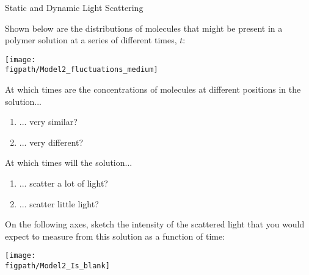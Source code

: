 \begin{activity}{Static and Dynamic Light Scattering}
\begin{model}
	Shown below are the distributions of molecules that might be present in a polymer solution at a series of different times, $t$:
	
	\vspace{6pt}
	\centerline{\texttt{[image: \\figpath/Model2\_fluctuations\_medium]}}
	
\end{model}

\begin{ctqs}

	\question At which times are the concentrations of molecules at different positions in the solution...
	
		\begin{enumerate}
			\item ... very similar?
			
				\begin{solution}[0.25in]
				\end{solution}
			
			\item ... very different?
			
				\begin{solution}[0.25in]
				\end{solution}
		\end{enumerate}
		
	\question At which times will the solution...
	
		\begin{enumerate}
			\item ... scatter a lot of light?
			
				\begin{solution}[0.25in]
				\end{solution}
			
			\item ... scatter little light?
			
				\begin{solution}[0.25in]
				\end{solution}
				
		\end{enumerate}
		
		\clearpage
	\question On the following axes, sketch the intensity of the scattered light that you would expect to measure from this solution as a function of time:
	
		\vspace{6pt}
		\centerline{\texttt{[image: \\figpath/Model2\_Is\_blank]}}
		\vspace{6pt}
		

\end{ctqs}
\end{activity}
